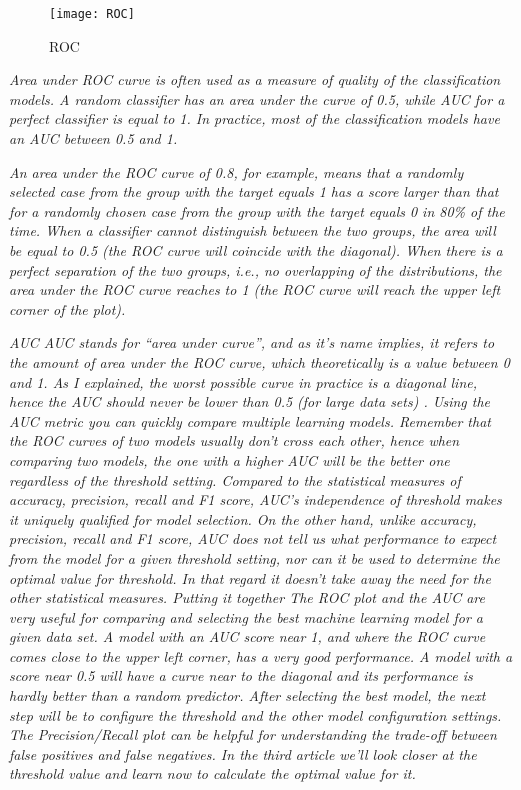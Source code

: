 \begin{figure}[H]
	\texttt{[image: ROC]}
	\caption[ROC]
	{ROC}
	\label{fig:ROC}
\end{figure}

\textit{Area under ROC curve is often used as a measure of quality of the classification models. A random classifier has an area under the curve of 0.5, while AUC for a perfect classifier is equal to 1. In practice, most of the classification models have an AUC between 0.5 and 1.}

\textit{An area under the ROC curve of 0.8, for example, means that a randomly selected case from the group with the target equals 1 has a score larger than that for a randomly chosen case from the group with the target equals 0 in 80\% of the time. When a classifier cannot distinguish between the two groups, the area will be equal to 0.5 (the ROC curve will coincide with the diagonal). When there is a perfect separation of the two groups, i.e., no overlapping of the distributions, the area under the ROC curve reaches to 1 (the ROC curve will reach the upper left corner of the plot).}

\textit{AUC
AUC stands for “area under curve”, and as it's name implies, it refers to the amount of area under the ROC curve, which theoretically is a value between 0 and 1. As I explained, the worst possible curve in practice is a diagonal line, hence the AUC should never be lower than 0.5 (for large data sets) .
Using the AUC metric you can quickly compare multiple learning models. Remember that the ROC curves of two models usually don’t cross each other, hence when comparing two models, the one with a higher AUC will be the better one regardless of the threshold setting. Compared to the statistical measures of accuracy, precision, recall and F1 score, AUC’s independence of threshold makes it uniquely qualified for model selection.
On the other hand, unlike accuracy, precision, recall and F1 score, AUC does not tell us what performance to expect from the model for a given threshold setting, nor can it be used to determine the optimal value for threshold. In that regard it doesn't take away the need for the other statistical measures.
Putting it together
The ROC plot and the AUC are very useful for comparing and selecting the best machine learning model for a given data set. A model with an AUC score near 1, and where the ROC curve comes close to the upper left corner, has a very good performance. A model with a score near 0.5 will have a curve near to the diagonal and its performance is hardly better than a random predictor.
After selecting the best model, the next step will be to configure the threshold and the other model configuration settings. The Precision/Recall plot can be helpful for understanding the trade-off between false positives and false negatives. In the third article we’ll look closer at the threshold value and learn now to calculate the optimal value for it.
}

